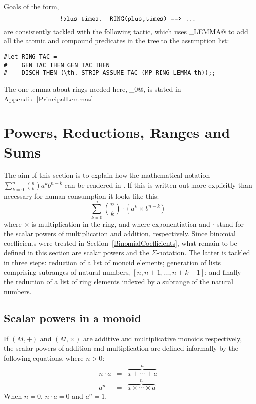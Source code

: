 Goals of the form,
\[
\mbox{\tt !plus times. RING(plus,times) ==> ...}
\]
are consistently tackled with the following tactic, which uses \verb@RING_LEMMA@
to add all the atomic and compound predicates in the tree to the assumption
list:
\begin{session}
\begin{verbatim}
#let RING_TAC =
#    GEN_TAC THEN GEN_TAC THEN
#    DISCH_THEN (\th. STRIP_ASSUME_TAC (MP RING_LEMMA th));;
\end{verbatim}
\end{session}
The one lemma about rings needed here, \verb@RING_0@, is stated in
Appendix~\ref{PrincipalLemmas}.


\section{Powers, Reductions, Ranges and Sums}
\label{PowersReductionsRangesSums}

The aim of this section is to explain how the mathematical notation
$\sum_{k=0}^n {n \choose k} a^k b^{n-k}$ can be rendered in \HOL{}.
If this is written out more explicitly than necessary for human
consumption it looks like this:
\[
\sum_{k=0}^n {n \choose k} \cdot (a^k \times b^{n-k})
\]
where $\times$ is multiplication in the ring, and where exponentiation
and $\cdot$ stand for the scalar powers of multiplication and addition,
respectively.  Since binomial coefficients were treated in
Section~\ref{BinomialCoefficients}, what remain to be defined in this section
are scalar powers and the $\Sigma$-notation.  The latter is tackled in
three steps: reduction of a list of monoid elements; generation of lists
comprising subranges of natural numbers, $[n,n+1,\ldots,n+k-1]$; and finally
the reduction of a list of ring elements indexed by a subrange of the natural
numbers.

\subsection{Scalar powers in a monoid}

If $(M,+)$ and $(M,\times)$ are additive and multiplicative
monoids respectively, the scalar powers of addition and multiplication are
defined informally by the following equations, where $n>0$:
\begin{eqnarray*}
n \cdot a &=& \overbrace{a + \cdots + a}^{n} \\
a^n &=& \overbrace{a \times \cdots \times a}^{n}
\end{eqnarray*}
When $n=0$, $n \cdot a = 0$ and $a^n = 1$.

